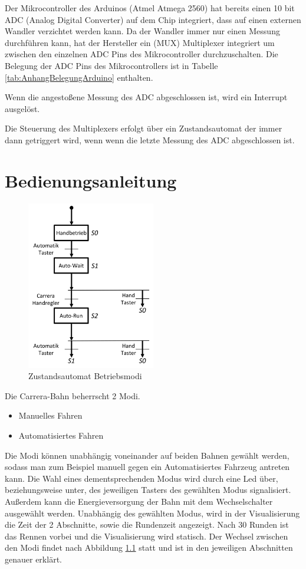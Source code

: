 \documentclass[a4paper, 11pt]{report}
\begin{document}
		Der Mikrocontroller des Arduinos (Atmel Atmega 2560) hat bereits einen 10 bit ADC (Analog Digital Converter) auf dem Chip integriert, dass auf einen externen Wandler verzichtet werden kann.
		Da der Wandler immer nur einen Messung durchführen kann, hat der Hersteller ein (MUX) Multiplexer integriert um zwischen den einzelnen ADC Pins des Mikrocontroller durchzuschalten.
		Die Belegung der ADC Pins des Mikrocontrollers ist in Tabelle \ref{tab:AnhangBelegungArduino} enthalten.

		Wenn die angestoßene Messung des ADC abgeschlossen ist, wird ein Interrupt ausgelöst.


		Die Steuerung des Multiplexers erfolgt über ein Zustandsautomat der immer dann getriggert wird, wenn wenn die letzte Messung des ADC abgeschlossen ist.



\chapter{Bedienungsanleitung}
	\begin{figure}[ht]
		\centering
		\includegraphics[width=0.5\textwidth]{rec/modiAuswahl.png}
		\caption{Zustandsautomat Betriebsmodi}
		\label{img:Betriebsmodi}
	\end{figure}
	Die Carrera-Bahn beherrscht 2 Modi.
	\begin{itemize}
		\item Manuelles Fahren
		\item Automatisiertes Fahren
	\end{itemize}
	Die Modi können unabhängig voneinander auf beiden Bahnen gewählt werden, sodass man zum Beispiel manuell gegen ein Automatisiertes Fahrzeug antreten kann. Die Wahl eines dementsprechenden Modus wird durch eine Led über, beziehungsweise unter, des jeweiligen Tasters des gewählten Modus signalisiert. Außerdem kann die Energieversorgung der Bahn mit dem Wechselschalter ausgewählt werden. Unabhängig des gewählten Modus, wird in der Visualisierung die Zeit der 2 Abschnitte, sowie die Rundenzeit angezeigt. Nach 30 Runden ist das Rennen vorbei und die Visualisierung wird statisch.
	Der Wechsel zwischen den Modi findet nach Abbildung \ref{img:Betriebsmodi} statt und ist in den jeweiligen Abschnitten genauer erklärt.
\end{document}
